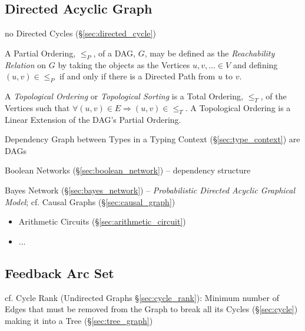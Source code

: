 \subsection{Directed Acyclic Graph}\label{sec:dag}

no Directed Cycles (\S\ref{sec:directed_cycle})

A Partial Ordering, $\leq_P$, of a DAG, $G$, may be defined as the
\emph{Reachability Relation} on $G$ by taking the objects as the
Vertices $u,v,... \in V$ and defining $(u,v) \in \leq_P$ if and only
if there is a Directed Path from $u$ to $v$.

A \emph{Topological Ordering} or \emph{Topological Sorting} is a Total
Ordering, $\leq_T$, of the Vertices such that $\forall (u,v) \in E
\Rightarrow (u,v) \in \leq_T$. A Topological Ordering is a Linear
Extension of the DAG's Partial Ordering. %

Dependency Graph between Types in a Typing Context (\S\ref{sec:type_context})
are DAGs

\fist Boolean Networks (\S\ref{sec:boolean_network}) -- dependency structure

\fist Bayes Network (\S\ref{sec:bayes_network}) -- \emph{Probabilistic Directed
  Acyclic Graphical Model}; cf. Causal Graphs (\S\ref{sec:causal_graph})

\begin{itemize}
  \item Arithmetic Circuits (\S\ref{sec:arithmetic_circuit})
  \item ...
\end{itemize}



\subsection{Feedback Arc Set}\label{sec:feedback_arc_set}

\fist cf. Cycle Rank (Undirected Graphs \S\ref{sec:cycle_rank}): Minimum number
of Edges that must be removed from the Graph to break all its Cycles
(\S\ref{sec:cycle}) making it into a Tree (\S\ref{sec:tree_graph})




